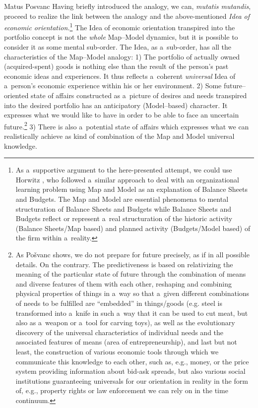 \begin{artengenv}{Matus Posvanc}
Having briefly introduced the analogy, we can, \textit{mutatis mutandis}, proceed to realize the link between the analogy and the above-mentioned \textit{Idea of economic orientation.}\footnote{As a~supportive argument to the here-presented attempt, we could use Horwitz 
\parencite*[][]{Horwitz2010Sensory}, %
 who followed a~similar approach to deal with an organizational learning problem using Map and Model as an explanation of Balance Sheets and Budgets. The Map and Model are essential phenomena to mental structuration of Balance Sheets and Budgets while Balance Sheets and Budgets reflect or represent a~real structuration of the historic activity (Balance Sheets/Map based) and planned activity (Budgets/Model based) of the firm within a~reality.} The Idea of economic orientation transpired into the portfolio concept is not the \textit{whole} Map–Model dynamics, but it is possible to consider it as some mental sub-order. The Idea, as a~sub-order, has all the characteristics of the Map–Model analogy: 1) The portfolio of actually owned (acquired-spent) goods is nothing else than the result of the person's past economic ideas and experiences. It thus reflects a~coherent \textit{universal} Idea of a~person's economic experience within his or her environment. 2) Some future–oriented state of affairs constructed as a~picture of desires and needs transpired into the desired portfolio has an anticipatory (Model–based) character. It expresses what we would like to have in order to be able to face an uncertain future.\footnote{As Pošvanc 
\parencite*[][]{Posvanc2021Evolutionary} %
 shows, we do not prepare for future precisely, as if in all possible details. On the contrary. The predictiveness is based on relativizing the meaning of the particular state of future through the combination of means and diverse features of them with each other, reshaping and combining physical properties of things in a~way so that a~given different combinations of needs to be fulfilled are ``embedded'' in things/goods (e.g. steel is transformed into a~knife in such a~way that it can be used to cut meat, but also as a~weapon or a~tool for carving toys), as well as the evolutionary discovery of the universal characteristics of individual needs and the associated features of means (area of entrepreneurship), and last but not least, the construction of various economic tools through which we communicate this knowledge to each other, such as, e.g., money, or the price system providing information about bid-ask spreads, but also various social institutions guaranteeing universals for our orientation in reality in the form of, e.g., property rights or law enforcement we can rely on in the time continuum.} 3) There is also a~potential state of affairs which expresses what we can realistically achieve as kind of combination of the Map and Model universal knowledge.




\end{artengenv}
